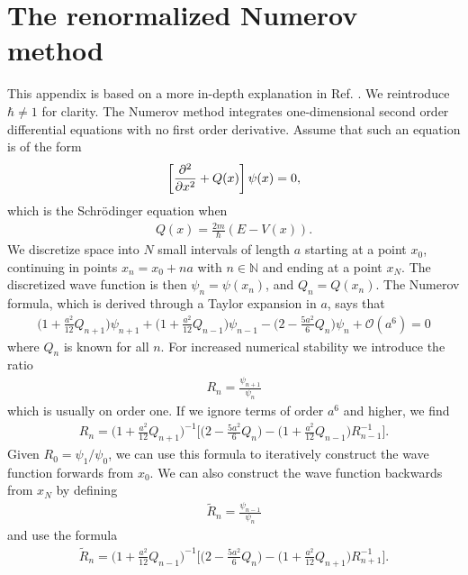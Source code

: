 \chapter{The renormalized Numerov method}
\label{app:numerov}

This appendix is based on a more in-depth explanation in Ref. \cite{doerkAtomion2008}. We reintroduce $\hbar \neq 1$ for clarity. The Numerov method integrates one-dimensional second order differential equations with no first order derivative. Assume that such an equation is of the form
\begin{align}
\left[ \frac{\partial^2 }{\partial x^2} + Q(x) \right] \psi(x) = 0,
\end{align}
which is the Schr\"odinger equation when
\begin{align}
Q(x) = \frac{2m}{\hbar} (E - V(x)).
\end{align}
We discretize space into $N$ small intervals of length $a$ starting at a point $x_0$, continuing in points $x_n = x_0 + n a$ with $n \in \mathbb{N}$ and ending at a point $x_N$. The discretized wave function is then $\psi_n = \psi(x_n)$, and $Q_n = Q(x_n)$. The Numerov formula, which is derived through a Taylor expansion in $a$, says that
\begin{align}
\Big(1 + \frac{a^2}{12} Q_{n+1}\Big) \psi_{n+1} 
+ \Big(1 + \frac{a^2}{12} Q_{n-1}\Big) \psi_{n-1} 
-\Big(2 - \frac{5 a^2}{6} Q_{n}\Big) \psi_{n} + \mathcal{O}(a^6) = 0
\end{align}
where $Q_n$ is known for all $n$. For increased numerical stability we introduce the ratio 
\begin{align}
R_n = \frac{\psi_{n+1}}{\psi_n} 
\end{align}
which is usually on order one. If we ignore terms of order $a^6$ and higher, we find
\begin{align}
R_n = \Big(1 + \frac{a^2}{12} Q_{n+1}\Big)^{-1} \Big[ \Big(2 - \frac{5 a^2}{6} Q_{n}\Big) - \Big(1 + \frac{a^2}{12} Q_{n-1}\Big) R^{-1}_{n-1} \Big].
\end{align}
Given $R_0 = \psi_1/\psi_0$, we can use this formula to iteratively construct the wave function forwards from $x_0$. We can also construct the wave function backwards from $x_N$ by defining 
\begin{align}
\tilde R_n = \frac{\psi_{n-1}}{\psi_n}
\end{align}
and use the formula
\begin{align}
\tilde R_n = \Big(1 + \frac{a^2}{12} Q_{n-1}\Big)^{-1} \Big[ \Big(2 - \frac{5 a^2}{6} Q_{n}\Big) - \Big(1 + \frac{a^2}{12} Q_{n+1}\Big) R^{-1}_{n+1} \Big].
\end{align}
